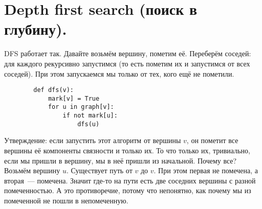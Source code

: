 \documentclass{article}
\begin{document}
    \section{Depth first search (поиск в глубину).}
    \begin{figure}[H]
    \end{figure}\noindent
    DFS работает так. Давайте возьмём вершину, пометим её. Переберём соседей: для каждого рекурсивно запустимся (то есть пометим их и запустимся от всех соседей). При этом запускаемся мы только от тех, кого ещё не пометили.
    \begin{verbatim}
        def dfs(v):
            mark[v] = True
            for u in graph[v]:
                if not mark[u]:
                    dfs(u)
    \end{verbatim}
    Утверждение: если запустить этот алгоритм от вершины $v$, он пометит все вершины её компоненты связности и только их. То что только их, тривиально, если мы пришли в вершину, мы в неё пришли из начальной. Почему все? Возьмём вершину $u$. Существует путь от $v$ до $v$. При этом первая не помечена, а вторая~--- помечена. Значит где-то на пути есть две соседних вершины с разной помеченностью. А это противоречие, потому что непонятно, как почему мы из помеченной не пошли в непомеченную.
\end{document}
